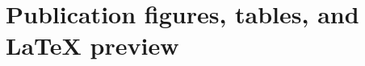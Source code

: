 \documentclass[11pt]{article}
\begin{document}
\section{Publication figures, tables, and LaTeX preview}

\end{document}
